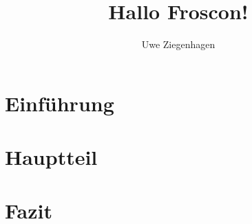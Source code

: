 \documentclass[ngerman]{scrartcl}
\title{Hallo Froscon!}
\author{Uwe Ziegenhagen}
\begin{document}
\maketitle

\tableofcontents

\section{Einführung}

\blindtext[25]

\section{Hauptteil}

\blindtext[25]


\section{Fazit}

\blindtext[25]
\end{document}
